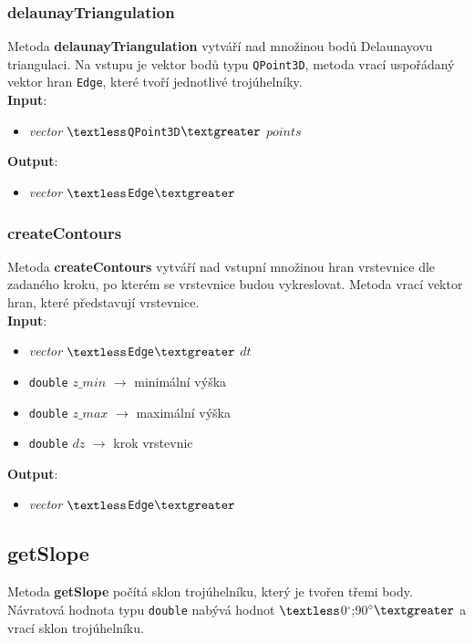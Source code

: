 \documentclass[a4paper, 12pt]{article}
\begin{document}
\subsubsection*{delaunayTriangulation}
Metoda \textbf{delaunayTriangulation} vytváří nad množinou bodů Delaunayovu triangulaci. Na vstupu je vektor bodů typu \texttt{QPoint3D}, metoda vrací uspořádaný vektor hran \texttt{Edge}, které tvoří jednotlivé trojúhelníky.\\

\textbf{Input}:
\begin{itemize}
\item \textsl{vector} $\textless$\texttt{QPoint3D}$\textgreater$ $points$
\end{itemize}

\textbf{Output}:
\begin{itemize}
\item \textsl{vector} $\textless$\texttt{Edge}$\textgreater$
\end{itemize}

\subsubsection*{createContours}
Metoda \textbf{createContours} vytváří nad vstupní množinou hran vrstevnice dle zadaného kroku, po kterém se vrstevnice budou vykreslovat.  Metoda vrací vektor hran, které představují vrstevnice.\\

\textbf{Input}:
\begin{itemize}
\item \textsl{vector} $\textless$\texttt{Edge}$\textgreater$ $dt$
\item \texttt{double} $z\_min$ $\rightarrow$ minimální výška
\item \texttt{double} $z\_max$ $\rightarrow$ maximální výška
\item \texttt{double} $dz$ $\rightarrow$ krok vrstevnic
\end{itemize}

\textbf{Output}:
\begin{itemize}
\item \textsl{vector} $\textless$\texttt{Edge}$\textgreater$
\end{itemize}

\subsection*{getSlope}
Metoda \textbf{getSlope} počítá sklon trojúhelníku, který je tvořen třemi body. Návratová hodnota typu \texttt{double} nabývá hodnot $\textless$0$^\circ$;90$^\circ\textgreater$ a vrací sklon trojúhelníku.\\
\end{document}
